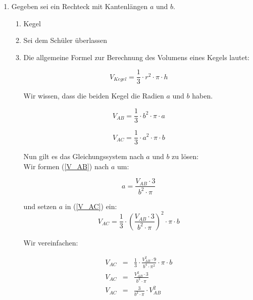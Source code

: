 \documentclass{scrartcl}
\begin{document}
		
	\begin{enumerate}
		\item Gegeben sei ein Rechteck mit Kantenlängen $a$ und $b$. 
			\begin{enumerate}
				\item Kegel	
				\item Sei dem Schüler überlassen
				\item Die allgemeine Formel zur Berechnung des Volumens eines Kegels lautet:
				
					\begin{equation}
						V_{Kegel} =\frac{1}{3}\cdot r^2 \cdot \pi \cdot h 
					\end{equation}
					
					Wir wissen, dass die beiden Kegel die Radien $a$ und $b$ haben. 
					
					\begin{equation}
						\label{V_AB}
						V_{AB} =\frac{1}{3}\cdot b^2 \cdot \pi \cdot a 
					\end{equation}
					
					\begin{equation}
						\label{V_AC}
						V_{AC} =\frac{1}{3}\cdot a^2 \cdot \pi \cdot b 
					\end{equation}
					
					
					Nun gilt es das Gleichungssystem nach $a$ und $b$ zu lösen:\\
					
					Wir formen (\ref{V_AB}) nach $a$ um:
					
					\begin{equation}
						a = \frac{V_{AB} \cdot 3}{b^2 \cdot \pi} 
					\end{equation}
					
					und setzen $a$ in (\ref{V_AC}) ein:
					\begin{equation}
						V_{AC} =\frac{1}{3}\cdot \left (\frac{V_{AB} \cdot 3}{b^2 \cdot \pi} \right )^2 \cdot \pi \cdot b 
					\end{equation}
					
					Wir vereinfachen: 
					
					\begin{eqnarray*}
						V_{AC} &=& \frac{1}{3}\cdot \frac{V_{AB}^2 \cdot 9}{b^4 \cdot \pi^2}  \cdot \pi \cdot b \\
						V_{AC} &=& \frac{V_{AB}^2 \cdot 3}{b^3 \cdot \pi} \\
						V_{AC} &=& \frac{3}{b^3 \cdot \pi} \cdot  V_{AB}^2 \\
					\end{eqnarray*}
						

\end{enumerate}
\end{enumerate}
\end{document}
